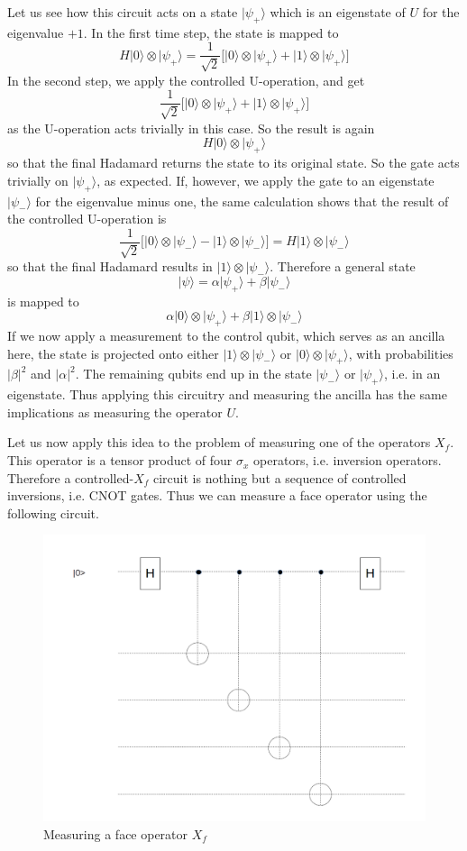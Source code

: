 \documentclass[a4paper, draft]{article}
\theoremstyle{own}
\theoremstyle{remark}
\begin{document}
Let us see how this circuit acts on a state $|\psi_+ \rangle$ which is an eigenstate of $U$ for the eigenvalue $+1$. In the first time step, the state is mapped to
$$
H|0 \rangle \otimes | \psi_+ \rangle = \frac{1}{\sqrt{2}} \big[ |0 \rangle \otimes | \psi_+ \rangle + | 1 \rangle \otimes | \psi_+ \rangle \big]
$$
In the second step, we apply the controlled U-operation, and get
$$
\frac{1}{\sqrt{2}} \big[ |0 \rangle \otimes | \psi_+ \rangle + | 1 \rangle \otimes | \psi_+ \rangle \big]
$$
as the U-operation acts trivially in this case. So the result is again
$$
H|0 \rangle \otimes | \psi_+ \rangle
$$
so that the final Hadamard returns the state to its original state. So the gate acts trivially on $|\psi_+ \rangle$, as expected. If, however, we apply the gate to an eigenstate $|\psi_- \rangle$ for the eigenvalue minus one, the same calculation shows that the result of the controlled U-operation is
$$
\frac{1}{\sqrt{2}} \big[ |0 \rangle \otimes | \psi_- \rangle - | 1 \rangle \otimes | \psi_- \rangle \big] = H|1 \rangle \otimes |\psi_- \rangle
$$
so that the final Hadamard results in $|1 \rangle \otimes |\psi_- \rangle$. Therefore a general state
$$
|\psi \rangle = \alpha |\psi_+ \rangle + \beta |\psi_- \rangle
$$
is mapped to
$$
\alpha |0 \rangle \otimes |\psi_+\rangle + \beta |1 \rangle \otimes |\psi_- \rangle
$$
If we now apply a measurement to the control qubit, which serves as an ancilla here, the state is projected onto either $|1 \rangle \otimes |\psi_- \rangle$ or $|0 \rangle \otimes |\psi_+ \rangle$, with probabilities $|\beta|^2$ and $|\alpha|^2$. The remaining qubits end up in the state $|\psi_-\rangle$ or $|\psi_+ \rangle$, i.e. in an eigenstate. Thus applying this circuitry and measuring the ancilla has the same implications as measuring the operator $U$.

Let us now apply this idea to the problem of measuring one of the operators $X_f$. This operator is a tensor product of four $\sigma_x$ operators, i.e. inversion operators. Therefore a controlled-$X_f$ circuit is nothing but a sequence of controlled inversions, i.e. CNOT gates. Thus we can measure a face operator using the following circuit.

\begin{figure}
\centering
\includegraphics[width=0.7\linewidth]{images/MeasuringXfI}
\caption{Measuring a face operator $X_f$}
\label{fig:MeasuringXfI}
\end{figure}
\end{document}
